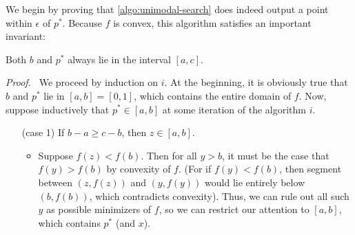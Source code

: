 \begin{lproof}
\begin{algorithm}
\begin{minipage}{0.49\linewidth}
\end{minipage}
\end{algorithm}

We begin by proving that \cref{algo:unimodal-search} does indeed output
a point within $\epsilon$ of
$p^*$.
Because $f$ is convex,
this algorithm satisfies an important invariant: 
    
\begin{iclaim} \label{claim:reduction-works}
    Both $b$ and $p^*$
    always lie in the interval $[a,c]$.
    \end{iclaim}
    \textit{Proof.~}
        We proceed by induction on $i$.
        At the beginning, it is obviously true that $b$ and $p^*$ lie in
        $[a,b] = [0,1]$, which contains the entire domain of $f$.
        Now, suppose inductively that $p^* \in [a,b]$ at some
        iteration of the algorithm $i$.
        \begin{itemize}[leftmargin=4em]
            \item [(case 1)] If $b-a \ge c-b$, then $z \in [a,b]$.
            \begin{itemize}[leftmargin=-1em]
                \item Suppose $f(z) < f(b)$. Then for
                all $y > b$, it must be the case that $f(y) > f(b)$ by convexity of $f$.
                (For if $f(y) < f(b)$, then segment between $(z, f(z))$ and $(y, f(y))$ would lie entirely below $(b, f(b))$, which contradicts convexity).
                Thus, we can rule out all such $y$ as possible minimizers of $f$, so
                we can restrict our attention to $[a, b]$, which contains $p^*$ (and $x$).


\end{itemize}
\end{itemize}
\end{lproof}
